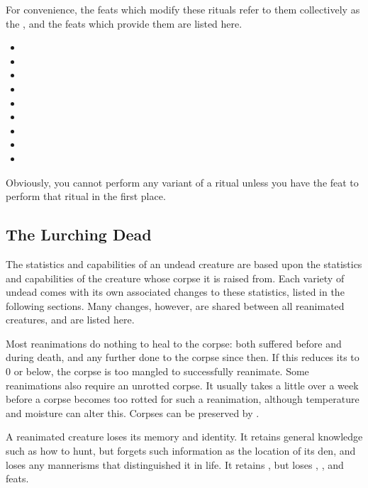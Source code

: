 For convenience, the feats which modify these rituals refer to them collectively as the {\reanimationrituals}, and the feats which provide them are listed here.
\begin{itemize}
	\item {}
	\item {}
	\item {}
	\item {}
	\item {}
	\item {}
	\item {}
	\item {}
	\item {}
\end{itemize}
Obviously, you cannot perform any variant of a ritual unless you have the feat to perform that ritual in the first place.

\subsection{The Lurching Dead}

The statistics and capabilities of an undead creature are based upon the statistics and capabilities of the creature whose corpse it is raised from.
Each variety of undead comes with its own associated changes to these statistics, listed in the following sections.
Many changes, however, are shared between all reanimated creatures, and are listed here.

Most reanimations do nothing to heal {\damage} to the corpse: both {\damage} suffered before and during death, and any further {\damage} done to the corpse since then.
If this reduces its  to 0 or below, the corpse is too mangled to successfully reanimate.
Some reanimations also require an unrotted corpse.
It usually takes a little over a week before a corpse becomes too rotted for such a reanimation, although temperature and moisture can alter this.
Corpses can be preserved by {\embalming}.

A reanimated creature loses its memory and identity.
It retains general knowledge such as how to hunt, but forgets such information as the location of its den, and loses any mannerisms that distinguished it in life.
It retains {\generalskills}, but loses {\specialityskills}, {\disciplineskills}, and feats.


